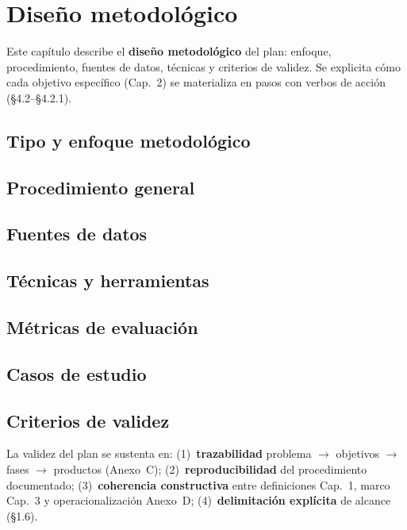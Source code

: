 \chapter{Diseño metodológico}
\label{cap:metodologia}

Este capítulo describe el \textbf{diseño metodológico} del plan: enfoque, procedimiento, fuentes de
datos, técnicas y criterios de validez. Se explicita cómo cada objetivo específico (Cap.~2) se
materializa en pasos con verbos de acción (§4.2--§4.2.1).

\section{Tipo y enfoque metodológico}


\section{Procedimiento general}


\section{Fuentes de datos}


\section{Técnicas y herramientas}
\label{sec:tecnicas-herramientas}


\section{Métricas de evaluación}


\section{Casos de estudio}


\section{Criterios de validez}

La validez del plan se sustenta en: (1)~\textbf{trazabilidad} problema $\rightarrow$ objetivos
$\rightarrow$ fases $\rightarrow$ productos (Anexo~C); (2)~\textbf{reproducibilidad} del
procedimiento documentado; (3)~\textbf{coherencia constructiva} entre definiciones Cap.~1, marco
Cap.~3 y operacionalización Anexo~D; (4)~\textbf{delimitación explícita} de alcance (§1.6).

